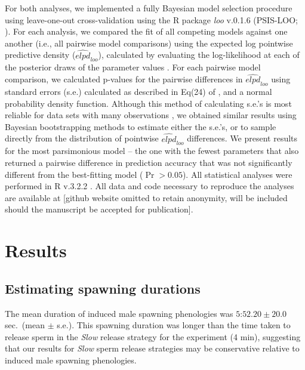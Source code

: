 \documentclass{article}
\begin{document}
	For both analyses, we implemented a fully Bayesian model selection procedure using leave-one-out cross-validation using the R package \textit{loo} v.0.1.6 (PSIS-LOO; \citealt{Vehtari2016}). For each analysis, we compared the fit of all competing models against one another (i.e., all pairwise model comparisons) using the expected log pointwise predictive density ($\widehat{\textit{elpd}}_{\textit{loo}}$), calculated by evaluating the log-likelihood at each of the posterior draws of the parameter values \citep{HootenHobbs2015,Vehtari2016}. For each pairwise model comparison, we calculated p-values for the pairwise differences in $\widehat{\textit{elpd}}_{\textit{loo}}$ using standard errors (s.e.) calculated as described in Eq(24) of \citet{Vehtari2016}, and a normal probability density function. Although this method of calculating s.e.'s is most reliable for data sets with many observations \citep{Vehtari2016}, we obtained similar results using Bayesian bootstrapping methods to estimate either the s.e.'s, or to sample directly from the distribution of pointwise $\widehat{\textit{elpd}}_{\textit{loo}}$ differences. We present results for the most parsimonious model -- the one with the fewest parameters that also returned a pairwise difference in prediction accuracy that was not significantly different from the best-fitting model ($\Pr > 0.05$). All statistical analyses were performed in R v.3.2.2 \citep{R2016}. All data and code necessary to reproduce the analyses are available at [github website omitted to retain anonymity, will be included should the manuscript be accepted for publication]. 

\section{Results}

	\subsection*{Estimating spawning durations}

	The mean duration of induced male spawning phenologies was $5$:$52.20 \pm 20.0$ sec.~(mean $\pm$ s.e.). This spawning duration was longer than the time taken to release sperm in the \textit{Slow} release strategy for the  experiment (4 min), suggesting that our results for \textit{Slow} sperm release strategies may be conservative relative to induced male spawning phenologies.
\end{document}
